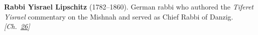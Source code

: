 \textbf{Rabbi Yisrael Lipschitz} (1782–1860). German rabbi who authored the \emph{Tiferet Yisrael} commentary on the Mishnah and served as Chief Rabbi of Danzig. \emph{[Ch.~\hyperref[ch:jewishcalendar]{26}]}

